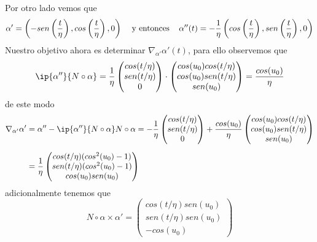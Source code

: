 \documentclass{article}
\begin{document}
Por otro lado vemos que
\begin{equation*}
    \alpha'=\left(-sen\left(\frac{t}{\eta}\right),cos\left(\frac{t}{\eta}\right),0\right)
    \hspace{4mm}\text{y entonces}\hspace{4mm}
    \alpha''(t)=-\frac{1}{\eta}\left(cos\left(\frac{t}{\eta}\right),
    sen\left(\frac{t}{\eta}\right),0\right)
\end{equation*}
Nuestro objetivo ahora es determinar $\nabla_{\alpha'}\alpha'(t)$, para ello observemos que
\begin{equation*}
    \ip{\alpha''}{N\circ\alpha}=\frac{1}{\eta}\begin{pmatrix}
        cos(t/\eta) \\ sen(t/\eta) \\ 0
    \end{pmatrix}\cdot\begin{pmatrix}
        cos(u_{0})cos(t/\eta) \\ cos(u_{0})sen(t/\eta) \\ sen(u_{0})
    \end{pmatrix}=\frac{cos(u_{0})}{\eta}
\end{equation*}
de este modo
\begin{align*}
    \nabla_{\alpha'}\alpha' &= \alpha''-\ip{\alpha''}{N\circ\alpha}N\circ\alpha
    =-\frac{1}{\eta}\begin{pmatrix}
        cos(t/\eta) \\ sen(t/\eta) \\ 0
    \end{pmatrix}+\frac{cos(u_{0})}{\eta}\begin{pmatrix}
        cos(u_{0})cos(t/\eta) \\ cos(u_{0})sen(t/\eta) \\ sen(u_{0})
    \end{pmatrix} \\[2mm]
    &= \frac{1}{\eta}\begin{pmatrix}
        cos(t/\eta)(cos^{2}(u_{0})-1) \\ sen(t/\eta)(cos^{2}(u_{0})-1) \\ cos(u_{0})sen(u_{0})
    \end{pmatrix}
\end{align*}
adicionalmente tenemos que
\begin{equation*}
    N\circ\alpha\times\alpha'=\begin{pmatrix}
        cos(t/\eta)sen(u_{0}) \\ sen(t/\eta)sen(u_{0}) \\ -cos(u_{0})
    \end{pmatrix}
\end{equation*}
\end{document}
